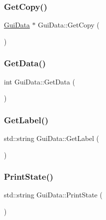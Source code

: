 \mbox{\label{class_gui_data_acaa63c8056ac7be58f10356c1985e6b8}} 
\subsubsection{\texorpdfstring{GetCopy()}{GetCopy()}}
{\footnotesize\ttfamily \mbox{\hyperlink{class_gui_data}{Gui\+Data}} $\ast$ Gui\+Data\+::\+Get\+Copy (\begin{DoxyParamCaption}{ }\end{DoxyParamCaption})}

\mbox{\label{class_gui_data_a749da21494ab07b9b418bcb5336c80e7}} 
\subsubsection{\texorpdfstring{GetData()}{GetData()}}
{\footnotesize\ttfamily int Gui\+Data\+::\+Get\+Data (\begin{DoxyParamCaption}{ }\end{DoxyParamCaption})}

\mbox{\label{class_gui_data_a75bee9d688d53423efcd6d4b0fb46e62}} 
\subsubsection{\texorpdfstring{GetLabel()}{GetLabel()}}
{\footnotesize\ttfamily std\+::string Gui\+Data\+::\+Get\+Label (\begin{DoxyParamCaption}{ }\end{DoxyParamCaption})}

\mbox{\label{class_gui_data_a0727523004840e82130d0db902e0b53f}} 
\subsubsection{\texorpdfstring{PrintState()}{PrintState()}}
{\footnotesize\ttfamily std\+::string Gui\+Data\+::\+Print\+State (\begin{DoxyParamCaption}{ }\end{DoxyParamCaption})}

